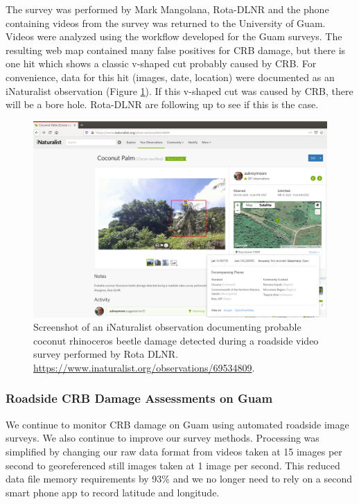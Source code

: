 \documentclass[12pt,letterpaper,english,bibliography=totocnumbered, abstract=on]{scrartcl}
\begin{document}
The survey was performed by Mark Mangolana, Rota-DLNR and the phone containing videos from the survey was returned to the University of Guam.  Videos were analyzed using the workflow developed for the Guam surveys. The resulting web map contained many false positives for CRB damage, but there is one hit which shows a classic v-shaped cut probably caused by CRB. For convenience, data for this hit (images, date, location) were documented as an iNaturalist observation (Figure \ref{fig:rota-inat-obs}). If this v-shaped cut was caused by CRB, there will be a bore hole. Rota-DLNR are following up to see if this is the case.


\begin{figure}[h]
	\centering
	\includegraphics[width=1\linewidth]{images/Rota-iNat-obs}
	\caption{Screenshot of an iNaturalist observation documenting probable coconut rhinoceros beetle damage detected during a roadside video survey performed by Rota DLNR. \url{https://www.inaturalist.org/observations/69534809}.}
	\label{fig:rota-inat-obs}
\end{figure}

\clearpage

\subsubsection{Roadside CRB Damage Assessments on Guam}

We continue to monitor CRB damage on Guam using automated roadside image surveys. We also continue to improve our survey methods. Processing was simplified by changing our raw data format from videos taken at 15 images per second to georeferenced still images taken at 1 image per second. This reduced data file memory requirements by 93\% and we no longer need to rely on a second smart phone app to record latitude and longitude.
\end{document}
